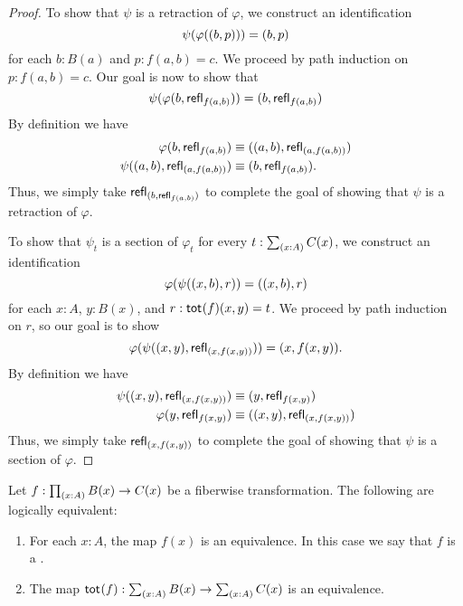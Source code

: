 \begin{proof}
To show that $\psi$ is a retraction of $\varphi$, we construct an identification 
\begin{equation*}
\psi(\varphi({\mathopen{}(b,p)\mathclose{}}))={\mathopen{}(b,p)\mathclose{}}
\end{equation*}
for each $b:B(a)$ and $p:f(a,b)=c$. We proceed by path induction on $p:f(a,b)=c$. Our goal is now to show that
\begin{equation*}
\psi(\varphi(b,\mathsf{refl}_{f(a,b)}))={\mathopen{}(b,\mathsf{refl}_{f(a,b)})\mathclose{}}
\end{equation*}
By definition we have
\begin{align*}
\varphi{\mathopen{}(b,\mathsf{refl}_{f(a,b)})\mathclose{}} & \equiv {\mathopen{}({\mathopen{}(a,b)\mathclose{}},\mathsf{refl}_{{\mathopen{}(a,f(a,b))\mathclose{}}})\mathclose{}} \\
\psi{\mathopen{}({\mathopen{}(a,b)\mathclose{}},\mathsf{refl}_{{\mathopen{}(a,f(a,b))\mathclose{}}})\mathclose{}} & \equiv{\mathopen{}(b,\mathsf{refl}_{f(a,b)})\mathclose{}}.
\end{align*}
Thus, we simply take $\mathsf{refl}_{{\mathopen{}(b,\mathsf{refl}_{f(a,b)})\mathclose{}}}$ to complete the goal of showing that $\psi$ is a retraction of $\varphi$.

To show that $\psi_t$ is a section of $\varphi_t$ for every $t:\sm{x:A}C(x)$, we construct an identification 
\begin{equation*}
\varphi(\psi{\mathopen{}({\mathopen{}(x,b)\mathclose{}},r)\mathclose{}})={\mathopen{}({\mathopen{}(x,b)\mathclose{}},r)\mathclose{}}
\end{equation*}
for each $x:A$, $y:B(x)$, and $r:\mathsf{tot}_{}(f)(x,y)=t$. 
We proceed by path induction on $r$, so our goal is to show
\begin{equation*}
\varphi(\psi({\mathopen{}(x,y)\mathclose{}},\mathsf{refl}_{{\mathopen{}(x,f(x,y))\mathclose{}}}))={\mathopen{}(x,f(x,y))\mathclose{}}.
\end{equation*}
By definition we have
\begin{align*}
\psi({\mathopen{}(x,y)\mathclose{}},\mathsf{refl}_{{\mathopen{}(x,f(x,y))\mathclose{}}})& \equiv {\mathopen{}(y,\mathsf{refl}_{f(x,y)})\mathclose{}} \\
\varphi{\mathopen{}(y,\mathsf{refl}_{f(x,y)})\mathclose{}} & \equiv {\mathopen{}({\mathopen{}(x,y)\mathclose{}},\mathsf{refl}_{{\mathopen{}(x,f(x,y))\mathclose{}}})\mathclose{}}
\end{align*}
Thus, we simply take $\mathsf{refl}_{{\mathopen{}(x,f(x,y))\mathclose{}}}$ to complete the goal of showing that $\psi$ is a section of $\varphi$.
\end{proof}

\begin{thm}\label{thm:fib_equiv}
Let $f:\prd{x:A}B(x)\to C(x)$ be a fiberwise transformation. The following are logically equivalent:
\begin{enumerate}
\item For each $x:A$, the map $f(x)$ is an equivalence. In this case we say that $f$ is a .
\item The map $\total{f}:\sm{x:A}B(x)\to\sm{x:A}C(x)$ is an equivalence.
\end{enumerate}
\end{thm}

